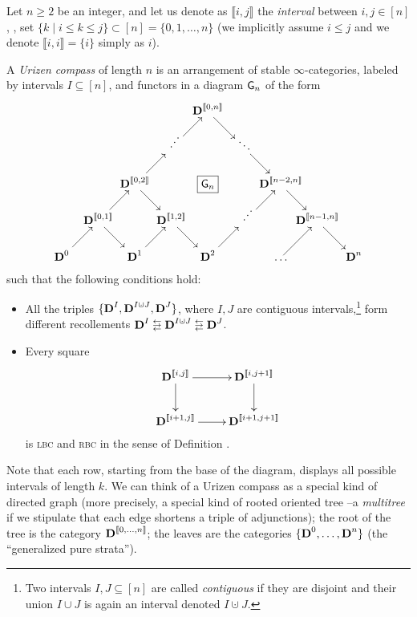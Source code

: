 Let $n\ge 2$ be an integer, and let us denote as $\llbracket i,j\rrbracket$ the \emph{interval} between $i,j\in [n]$, \ie, set $\{k\mid i\le k\le j\}\subset [n]=\{0,1,\dots,n\}$ (we implicitly assume $i \le j$ and we denote $\llbracket i,i\rrbracket = \{i\}$ simply as $i$).
\begin{definition}\label{defUrizen}
 

A \emph{Urizen compass} of length $n$ is an arrangement of stable $\infty$\hyp{}categories, labeled by intervals $I\subseteq [n]$,  and functors in a diagram $\mathsf{G}_n$ of the form
\[\label{ponzi}
\xymatrix@!R=3mm@!C=3mm{
  	& 	& 	& 	& \D^{\llbracket 0, n\rrbracket} \\
  	& 	& 	& \iddots	& 	& \ddots \\
  	& 	& \D^{\llbracket0,2\rrbracket}	& 	& \boxed{\dgrm{G}_n}	& 	& \D^{\llbracket n-2,n\rrbracket} \\
  	& \D^{\llbracket 0,1\rrbracket}	& 	& \D^{\llbracket 1,2\rrbracket}	& 	& \iddots	& 	& \D^{\llbracket n-1,n\rrbracket} \\
  \D^0	& 	& \D^1	& 	& \D^2	& 	& \dots	& 	& \D^n
  \ar "1,5";"2,6" 
  \ar "2,4";"1,5" 
  \ar "2,6";"3,7" 
  \ar "3,3";"2,4" 
  \ar "3,3";"4,4" 
  \ar "3,7";"4,8" 
  \ar "4,2";"5,3" 
  \ar "4,2";"3,3" 
  \ar "4,4";"5,5" 
  \ar "4,6";"3,7" 
  \ar "4,8";"5,9" 
  \ar "5,1";"4,2" 
  \ar "5,3";"4,4" 
  \ar "5,5";"4,6" 
  \ar "5,7";"4,8" 
}
\]
such that the following conditions hold:
\begin{itemize}
\item All the triples $\{\D^{I}, \D^{I\cupdot J}, \D^{J}\}$, where $I,J$ are contiguous intervals,\footnote{Two intervals $I,J\subseteq [n]$ are called \emph{contiguous} if they are disjoint and their union $I\cup J$ is again an interval denoted $I\cupdot J$.} form different recollements $\D^{I}\lrlarrows \D^{I\cupdot J}\lrlarrows \D^{J}$.
\item Every square 
\[
	\xymatrix{
	  \D^{\llbracket i,j\rrbracket}	& \D^{\llbracket i,j+1\rrbracket} \\
	  \D^{\llbracket i+1,j\rrbracket}	& \D^{\llbracket i+1,j+1\rrbracket}
	  \ar "1,1";"1,2" 
	  \ar "1,1";"2,1" 
	  \ar "1,2";"2,2" 
	  \ar "2,1";"2,2" 
	}
\]
is \textsc{lbc} and \textsc{rbc} in the sense of Definition .
\end{itemize}
\end{definition}
Note that each row, starting from the base of the diagram, displays all possible intervals of length $k$. We can think of a Urizen compass as a special kind of directed graph (more precisely, a special kind of rooted oriented tree --a \emph{multitree} if we stipulate that each edge shortens a triple of adjunctions); the root of the tree is the category $\textbf{D}^{\llbracket 0,\dots, n\rrbracket}$; the leaves are the categories $\{\textbf{D}^0,\dots, \textbf{D}^n\}$ (the ``generalized pure strata'').

